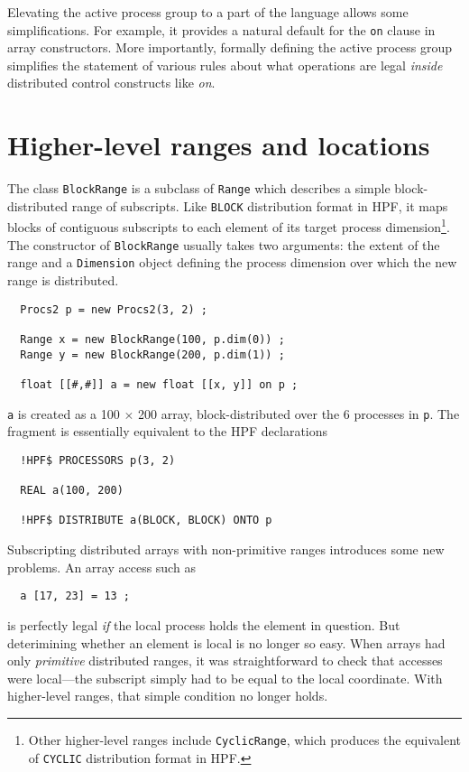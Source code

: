 Elevating the active process group to a part of the language
allows some simplifications.  For example, it provides a natural
default for the {\tt on} clause in array constructors.
More importantly, formally defining the active process group
simplifies the statement of various rules about what operations are legal
{\em inside} distributed control constructs like {\em on}.

\section{Higher-level ranges and locations}

The class {\tt BlockRange} is a subclass of {\tt Range} which describes
a simple block-distributed range of subscripts.  Like {\tt BLOCK}
distribution format in HPF, it maps blocks of contiguous subscripts
to each element of its target process dimension\footnote{Other higher-level
ranges include {\tt CyclicRange}, which produces the equivalent
of {\tt CYCLIC} distribution format in HPF.}.  The constructor
of {\tt BlockRange} usually takes two arguments: the extent of the range
and a {\tt Dimension} object defining the process dimension over
which the new range is distributed.
\small
\begin{verbatim}
  Procs2 p = new Procs2(3, 2) ;
  
  Range x = new BlockRange(100, p.dim(0)) ;
  Range y = new BlockRange(200, p.dim(1)) ;

  float [[#,#]] a = new float [[x, y]] on p ;
\end{verbatim}
\normalsize
{\tt a} is created as a 100 $\times$ 200 array, block-distributed
over the 6 processes in {\tt p}.  The fragment is
essentially equivalent to the HPF declarations
\small
\begin{verbatim}
  !HPF$ PROCESSORS p(3, 2)
  
  REAL a(100, 200)

  !HPF$ DISTRIBUTE a(BLOCK, BLOCK) ONTO p
\end{verbatim}
\normalsize
Subscripting distributed arrays with non-primitive ranges
introduces some new problems.  An array access such as
\small
\begin{verbatim}
  a [17, 23] = 13 ;
\end{verbatim}
\normalsize
is perfectly legal {\em if} the local process holds the element in question.
But deterimining whether an element is local is no longer so easy.
When arrays had only {\em primitive} distributed ranges, it
was straightforward to check that accesses were local---the
subscript simply had to be equal to the local coordinate.  With
higher-level ranges, that simple condition no longer holds.

